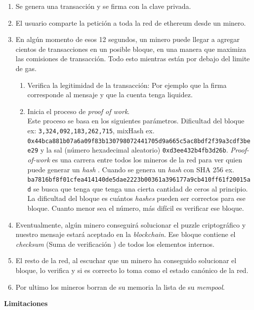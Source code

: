 \begin{enumerate}
    \item Se genera una transacción y se firma con la clave privada.
    \item El usuario comparte la petición a toda la red de ethereum desde un minero.
    \item En algún momento de esos 12 segundos, un minero puede llegar a agregar cientos de transacciones en un posible bloque, en una manera que maximiza las comisiones de transacción. Todo esto mientras están por debajo del limite de gas.
    \begin{enumerate}
        \item Verifica la legitimidad de la transacción: Por ejemplo que la firma corresponde al mensaje y que la cuenta tenga liquidez.
        \item Inicia el proceso de \textit{proof of work}.\\ 
        Este proceso se basa en los siguientes parámetros. Dificultad del bloque ex:
        \texttt{3,324,092,183,262,715}, mixHash ex.\\ \texttt{0x44bca881b07a6a09f83b130798072441705d9a665c5ac8bdf2f39a3cdf3bee29} y la sal (número hexadecimal aleatorio) 
        \texttt{0xd3ee432b4fb3d26b}. \textit{Proof-of-work} es una carrera entre todos los mineros de la red para ver quien puede generar un \textit{hash} \cite{web:hash}. Cuando se genera un \textit{hash} con SHA 256 ex. \\
        \texttt{ba7816bf8f01cfea414140de5dae2223b00361a396177a9cb410ff61f20015ad} se busca que tenga que tenga una cierta cantidad de ceros al principio. La dificultad del bloque es cuántos \textit{hashes} pueden ser correctos para ese bloque. Cuanto menor sea el número, más difícil es verificar ese bloque.
    \end{enumerate}
    \item Eventualmente, algún minero conseguirá solucionar el puzzle criptográfico y nuestro mensaje estará aceptado en la \textit{blockchain}. Ese bloque contiene el \textit{checksum} (Suma de verificación \cite{web:checksum}) de todos los elementos internos.
    \item El resto de la red, al escuchar que un minero ha conseguido solucionar el bloque, lo verifica y si es correcto lo toma como el estado canónico de la red.
    \item Por ultimo los mineros borran de su memoria la lista de su \textit{mempool}. \cite{web:mining}
\end{enumerate}
\textbf{Limitaciones}\\
